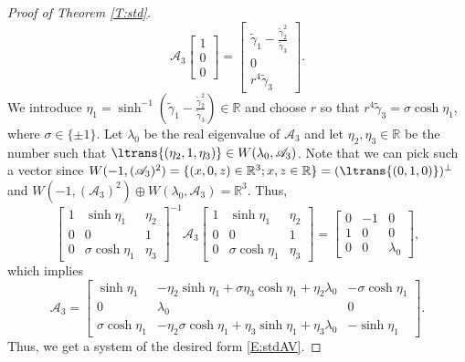 \documentclass[11pt,a4paper,oneside]{amsart}
\theoremstyle{plain}
\theoremstyle{remark}
\numberwithin{equation}{section}
\newcommand{\R}{\mathbb{R}}
\theoremstyle{definition}
\begin{document}
\begin{proof}[Proof of Theorem \ref{T:std}]
\[	\mathscr{A}_3\begin{bmatrix} 1 \\0\\0 \end{bmatrix}
	= \begin{bmatrix} \widetilde{\gamma}_1-\tfrac{\widetilde{\gamma}_2^2}{\widetilde{\gamma}_3} \\ 0 \\r^4 \widetilde{\gamma}_3 \end{bmatrix}.
\]
We introduce $\eta_1 = \sinh^{-1} (\widetilde{\gamma}_1-\tfrac{\widetilde{\gamma}_2^2}{\widetilde{\gamma}_3})\in \R$ and choose
$r$ so that
	$r^4\widetilde{\gamma}_3 =  \sigma \cosh \eta_1$,
where $\sigma\in\{\pm1\}$.
Let $\lambda_0$ be the real eigenvalue of $\mathscr{A}_3$ and let $\eta_2,\eta_3 \in \R$ be the number such that
$\ltrans{(\eta_2,1,\eta_3)}\in W(\lambda_0,\mathscr{A}_3)$. Note that we can pick such a vector since $W(-1,(\mathscr{A}_3)^2)=\{(x,0,z) \in \R^3 ; x,z\in\R\}=(\ltrans{(0,1,0)})^\perp$ and $W(-1,(\mathscr{A}_3)^2) \oplus W(\lambda_0,\mathscr{A}_3) = \R^3$. 
Thus,
\[
	\begin{bmatrix}
	1 &  \sinh \eta_1 & \eta_2 \\
	0 & 0 & 1 \\
	0 &  \sigma \cosh \eta_1 & \eta_3
	\end{bmatrix}^{-1}
	\mathscr{A}_3
	\begin{bmatrix}
	1 & \sinh \eta_1 & \eta_2 \\
	0 & 0 & 1 \\
	0 & \sigma \cosh \eta_1 & \eta_3
	\end{bmatrix}
	=
	\begin{bmatrix}
	0 & -1 & 0 \\
	1 & 0 & 0 \\
	0 & 0 & \lambda_0
	\end{bmatrix},
\]
which implies
\begin{equation}\label{E:stdAform}
	\mathscr{A}_3 =\begin{bmatrix}
	\sinh \eta_1 & -\eta_2 \sinh \eta_1 + \sigma \eta_3\cosh \eta_1 + \eta_2 \lambda_0 & -\sigma \cosh \eta_1 \\
	0 & \lambda_0 & 0 \\
	\sigma \cosh  \eta_1& -\eta_2 \sigma \cosh \eta_1+\eta_3 \sinh \eta_1 + \eta_3 \lambda_0 & - \sinh \eta_1
	\end{bmatrix}.
\end{equation}
Thus, we get a system of the desired form \eqref{E:stdAV}.


\end{proof}
\end{document}
